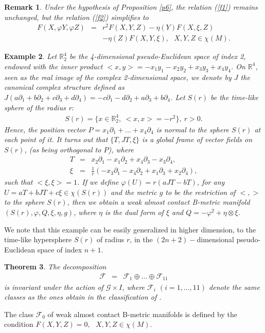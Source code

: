 \documentclass{article}
\newtheorem{theorem}{Theorem}
\newtheorem{example}[theorem]{Example}
\newtheorem{remark}[theorem]{Remark}
\begin{document}
\begin{remark}
 Under the hypothesis of Proposition \ref{p6}, the relation (\ref{f1}) remains unchanged, but the relation (\ref{f2}) simplifies to 
 \begin{eqnarray}
 	F(X,\varphi Y,\varphi Z)&=&r^2F(X,Y,Z)-\eta(Y)F(X,\xi,Z)\label{f3}\\
 	&&	-\eta(Z)F(X,Y,\xi), \ \ \ X,Y,Z\in\chi(M). \nonumber
 \end{eqnarray}	
\end{remark}

\begin{example}
	Let $\mathbb{R}^4_{2}$ be the 4-dimensional pseudo-Euclidean space of index 2, endowed with the inner product $<x,y>=-x_1y_1-x_2y_2+x_3y_3+x_4y_4$. On $\mathbb{R}^4$, seen as the real image of the complex 2-dimensional space, we denote by $J$ the canonical complex structure defined as $J(a\partial_1+b\partial_2+c\partial_3+d\partial_4)=-c\partial_1-d\partial_2+a\partial_3+b\partial_4$. Let $S(r)$ be the time-like sphere of the radius r:
	\begin{eqnarray*}
		S(r)=\{x\in\mathbb{R}^4_2, \ <x,x>=-r^2\},  \ r>0.
	\end{eqnarray*}
	Hence, the position vector $P=x_1\partial_1+...+x_4\partial_4$ is normal to the sphere $S(r)$ at each point of it. It turns out that $\{T,JT,\xi\}$ is a global frame of vector fields on $S(r)$, (as being orthogonal to $P$), where 
	\begin{eqnarray*}
		T&=&x_2\partial_1-x_1\partial_2+x_4\partial_3-x_3\partial_4,\\
		\xi&=&\frac{1}{r}(-x_3\partial_1-x_4\partial_2+x_1\partial_3+x_2\partial_4),
	\end{eqnarray*}
such that $<\xi,\xi>=1$. If we define $\varphi(U)=r(aJT-bT)$, for any $U=aT+bJT+c\xi\in\chi(S(r))$ and the metric $g$ to be the restriction of $<,>$ to the sphere $S(r)$, then we obtain a weak almost contact B-metric manifold $(S(r),\varphi,Q,\xi,\eta, g)$, where $\eta$ is the dual form of $\xi$ and $Q=-\varphi^2+\eta\otimes\xi$. 
\end{example}

We note that this example can be easily generalized in higher dimension, to the time-like hypersphere $S(r)$ of radius $r$, in the $(2n+2)-$dimensional pseudo-Euclidean space of index $n+1$.


\begin{theorem}
The decomposition
\begin{eqnarray}
	\mathcal{F}&=&	\mathcal{F}_1\oplus...\oplus	\mathcal{F}_{11} \nonumber
\end{eqnarray}	
is invariant under the action of $\mathcal{G}\times I$, where $	\mathcal{F}_i$ $(i=1,...,11)$ denote the same classes as the ones obtain in the classification of \cite{Ganchev1}.	
\end{theorem}
The class $\mathcal{F}_0$ of weak almost contact B-metric manifolds is defined by the condition $	F(X,Y,Z)= 0, \ \ \ X,Y,Z\in\chi(M). $\medskip
\end{document}
